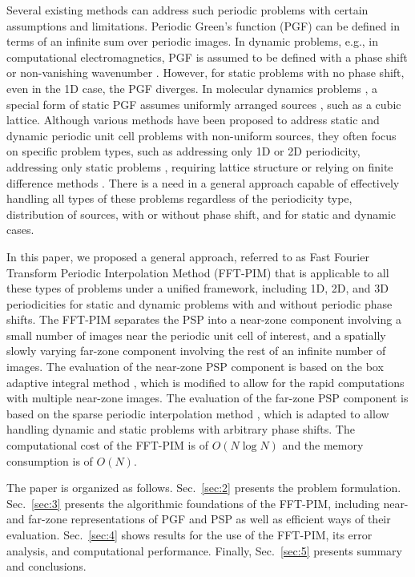 \documentclass{article}
\begin{document}
Several existing methods can address such periodic problems with certain assumptions and limitations\textcolor{black}{\cite{r1_1, r1_2, r1_3, r1_4}}. Periodic Green's function (PGF) can be defined in terms of an infinite sum over periodic images. In dynamic problems, e.g., in computational electromagnetics, PGF is assumed to be defined with a phase shift or non-vanishing wavenumber \cite{CAPOLINO2007250, FPIP, Derek}. However, for static problems with no phase shift, even in the 1D case, the PGF diverges. In molecular dynamics problems \cite{molecule}, a special form of static PGF assumes uniformly arranged sources \cite{LGF}, such as a cubic lattice. Although various methods have been proposed to address static and dynamic periodic unit cell problems with non-uniform sources, they often focus on specific problem types, such as addressing only 1D or 2D periodicity, addressing only static problems \cite{Lebecki_2008}, requiring lattice structure or relying on finite difference methods \cite{fdtd}. There is a need in a general approach capable of effectively handling all types of these problems regardless of the periodicity type, distribution of sources, with or without phase shift, and for static and dynamic cases.

In this paper, we proposed a general approach, referred to as Fast Fourier Transform Periodic Interpolation Method (FFT-PIM) that is applicable to all these types of problems under a unified framework, including 1D, 2D, and 3D periodicities for static and dynamic problems with and without periodic phase shifts. The FFT-PIM separates the PSP into a near-zone component involving a small number of images near the periodic unit cell of interest, and a spatially slowly varying far-zone component involving the rest of an infinite number of images. The evaluation of the near-zone PSP component is based on the box adaptive integral method \cite{NUFFT}, which is modified to allow for the rapid computations with multiple near-zone images. The evaluation of the far-zone PSP component is based on the sparse periodic interpolation method \cite{5582244}, which is adapted to allow handling dynamic and static problems with arbitrary phase shifts. The computational cost of the FFT-PIM is of $O(N\log N)$ and the memory consumption is of $O(N)$.

The paper is organized as follows. Sec.~\ref{sec:2} presents the problem formulation. Sec.~\ref{sec:3} presents the algorithmic foundations of the FFT-PIM, including near- and far-zone representations of PGF and PSP as well as efficient ways of their evaluation. Sec.~\ref{sec:4} shows results for the use of the FFT-PIM, its error analysis, and computational performance. Finally, Sec.~\ref{sec:5} presents summary and conclusions. 
\end{document}
